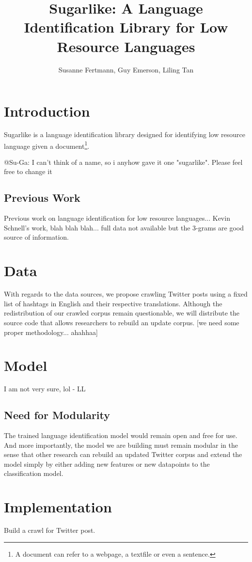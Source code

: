 \documentclass[11pt]{article}
\title{\textbf{Sugarlike: A Language Identification Library for Low Resource Languages}}
\author{Susanne Fertmann, Guy Emerson, Liling Tan}
\date{}
\begin{document}
\maketitle

\section{Introduction}

Sugarlike is a language identification library designed for identifying low resource language given a document\footnote{A document can refer to a webpage, a textfile or even a sentence.}.

@Su-Ga: I can't think of a name, so i anyhow gave it one "sugarlike". Please feel free to change it

\subsection{Previous Work}

Previous work on language identification for low resource languages...
Kevin Schnell's work, blah blah blah... full data not available but the 3-grams are good source of information.

\section{Data}
With regards to the data sources, we propose crawling Twitter posts using a fixed list of hashtags in English and their respective translations. Although the redistribution of our crawled corpus remain questionable, we will distribute the source code that allows researchers to rebuild an update corpus. [we need some proper methodology... ahahhaa]

\section{Model}

I am not very sure, lol - LL

\subsection{Need for Modularity}

The trained language identification model would remain open and free for use. And more importantly, the model we are building must remain modular in the sense that other research can rebuild an updated Twitter corpus and extend the model simply by either adding new features or new datapoints to the classification model.


\section{Implementation}

Build a crawl for Twitter post.
\end{document}
